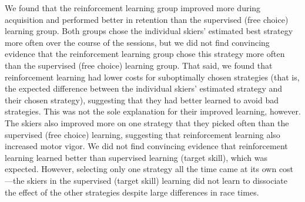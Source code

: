 \documentclass[pdflatex,sn-mathphys-num]{sn-jnl}%
\theoremstyle{thmstyleone}%
\theoremstyle{thmstyletwo}%
\theoremstyle{thmstylethree}%
\begin{document}
We found that the reinforcement learning group improved more during acquisition and performed better in retention than the supervised (free choice) learning group. Both groups chose the individual skiers' estimated best strategy more often over the course of the sessions, but we did not find convincing evidence that the reinforcement learning group chose this strategy more often than the supervised (free choice) learning group. That said, we found that reinforcement learning had lower costs for suboptimally chosen strategies (that is, the expected difference between the individual skiers' estimated strategy and their chosen strategy), suggesting that they had better learned to avoid bad strategies. This was not the sole explanation for their improved learning, however. The skiers also improved more on one strategy that they picked often than the supervised (free choice) learning, suggesting that reinforcement learning also increased motor vigor. We did not find convincing evidence that reinforcement learning learned better than supervised learning (target skill), which was expected.  However, selecting only one strategy all the time came at its own cost—the skiers in the supervised (target skill) learning did not learn to dissociate the effect of the other strategies despite large differences in race times. 
\end{document}
